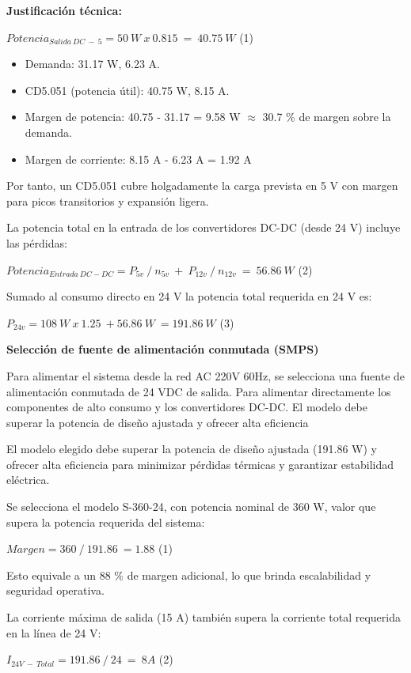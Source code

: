 \documentclass[12pt,a4paper,oneside]{report}
\begin{document}
\textbf{Justificación técnica:}

\(Potencia_{Salida\ DC\  - \ 5} = 50\ W\ x\ 0.815\  = \ 40.75\ W\) (1)

\begin{itemize}
\item
  Demanda: 31.17 W,  6.23 A.
\item
  CD5.051 (potencia útil): 40.75 W,  8.15 A.
\item
  Margen de potencia: 40.75 - 31.17 = 9.58 W \ensuremath{\approx} 30.7 \% de margen sobre la demanda.
\item
  Margen de corriente: 8.15 A - 6.23 A = 1.92 A
\end{itemize}

Por tanto, un CD5.051 cubre holgadamente la carga prevista en 5 V con margen para picos transitorios y expansión ligera.

La potencia total en la entrada de los convertidores DC-DC (desde 24 V) incluye las pérdidas:

\(Potencia_{Entrada\ DC - DC} = P_{5v}\ /\ n_{5v}\  + \ P_{12v}\ /\ n_{12v}\  = \ 56.86\ W\) (2)

Sumado al consumo directo en 24 V la potencia total requerida en 24 V es:

\(P_{24v} = 108\ W\ x\ 1.25\  + 56.86\ W\  = 191.86\ W\) (3)

\textbf{Selección de fuente de alimentación conmutada (SMPS)}

Para alimentar el sistema desde la red AC 220V 60Hz, se selecciona una fuente de alimentación conmutada de 24 VDC de salida. Para alimentar directamente los componentes de alto consumo y los convertidores DC-DC. El modelo debe superar la potencia de diseño ajustada y ofrecer alta eficiencia

El modelo elegido debe superar la potencia de diseño ajustada (191.86 W) y ofrecer alta eficiencia para minimizar pérdidas térmicas y garantizar estabilidad eléctrica.

Se selecciona el modelo S-360-24, con potencia nominal de 360 W, valor que supera la potencia requerida del sistema:

\(Margen = 360\ /\ 191.86\  = 1.88\) (1)

Esto equivale a un 88 \% de margen adicional, lo que brinda escalabilidad y seguridad operativa.

La corriente máxima de salida (15 A) también supera la corriente total requerida en la línea de 24 V:

\(I_{24V\  - \ Total} = 191.86\ /\ 24\  = \ 8A\) (2)
\end{document}
